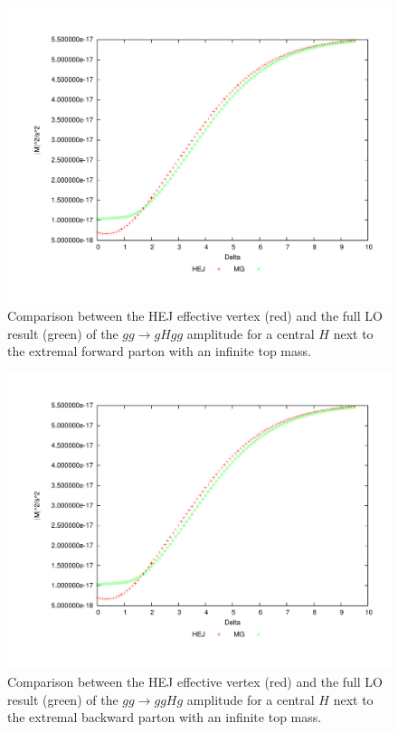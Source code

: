 \begin{figure}[t]
\centering
\includegraphics[scale=0.45]{Images/gg_cen1.pdf}
\caption{Comparison between the HEJ effective vertex (red) and the full LO result (green) of the $gg \to gHgg$ amplitude for a central $H$ next to the extremal forward parton with an infinite top mass.}
\label{fig:gg_ggh_2}
\end{figure}

\begin{figure}[t]
\centering
\includegraphics[scale=0.45]{Images/gg_cen2.pdf}
\caption{Comparison between the HEJ effective vertex (red) and the full LO result (green) of the $gg \to ggHg$ amplitude for a central $H$ next to the extremal backward parton with an infinite top mass.}
\label{fig:gg_ggh_3}
\end{figure}


